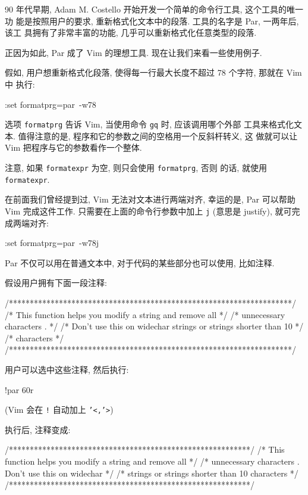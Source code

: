 90 年代早期, Adam M. Costello 开始开发一个简单的命令行工具, 这个工具的唯一功
能是按照用户的要求, 重新格式化文本中的段落. 工具的名字是 Par, 一两年后, 该工
具拥有了非常丰富的功能, 几乎可以重新格式化任意类型的段落.

正因为如此, Par 成了 Vim 的理想工具. 现在让我们来看一些使用例子.

假如, 用户想重新格式化段落, 使得每一行最大长度不超过 78 个字符, 那就在 Vim 中
执行:
\begin{vimcode}
:set formatprg=par\ -w78
\end{vimcode}

选项 \texttt{formatprg} 告诉 Vim, 当使用命令 \texttt{gq} 时, 应该调用哪个外部
工具来格式化文本. 值得注意的是, 程序和它的参数之间的空格用一个反斜杆转义, 这
做就可以让 Vim 把程序与它的参数看作一个整体.

\begin{warning}
    注意, 如果 \texttt{formatexpr} 为空, 则只会使用 \texttt{formatprg}, 否则
    的话, 就使用 \texttt{formatexpr}.
\end{warning}

在前面我们曾经提到过, Vim 无法对文本进行两端对齐, 幸运的是, Par 可以帮助 Vim
完成这件工作. 只需要在上面的命令行参数中加上 \texttt{j} (意思是 justify),
就可完成两端对齐:
\begin{vimcode}
:set formatprg=par\ -w78j
\end{vimcode}

Par 不仅可以用在普通文本中, 对于代码的某些部分也可以使用, 比如注释.

假设用户拥有下面一段注释:
\begin{vimcode}
/********************************************************************/
/* This function helps you modify a string and remove all */
/* unnecessary characters . */
/* Don't use this on widechar strings or strings shorter than 10 */
/* characters */
/********************************************************************/
\end{vimcode}
用户可以选中这些注释, 然后执行:
\begin{vimcode}
!par 60r
\end{vimcode}
(Vim 会在 \texttt{!} 自动加上 \texttt{'<,'>})

执行后, 注释变成:
\begin{vimcode}
/**********************************************************/
/* This function helps you modify a string and remove all */
/* unnecessary characters . Don't use this on widechar    */
/* strings or strings shorter than 10 characters          */
/**********************************************************/
\end{vimcode}


